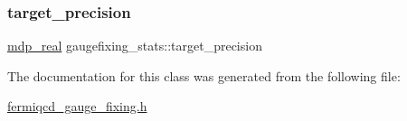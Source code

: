 \subsubsection{\texorpdfstring{target\+\_\+precision}{target\_precision}}
{\footnotesize\ttfamily \hyperlink{mdp__global__vars_8h_a69d96b74c791e0bbdb888b3913a69450}{mdp\+\_\+real} gaugefixing\+\_\+stats\+::target\+\_\+precision}



The documentation for this class was generated from the following file\+:\begin{DoxyCompactItemize}
\item 
\hyperlink{fermiqcd__gauge__fixing_8h}{fermiqcd\+\_\+gauge\+\_\+fixing.\+h}\end{DoxyCompactItemize}
